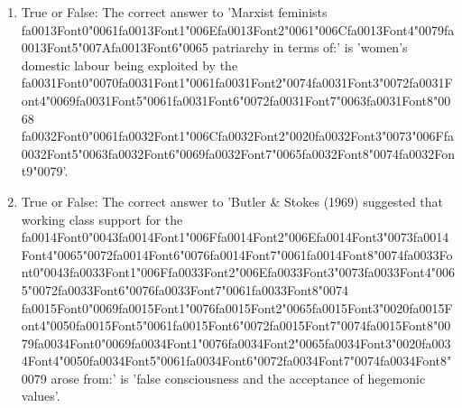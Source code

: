 \documentclass[12pt]{article}
\begin{document}
\begin{enumerate}[label=\arabic*.]
\item True or False: The correct answer to 'Marxist feminists {\csname fa0013Font0\endcsname\char"0061}{\csname fa0013Font1\endcsname\char"006E}{\csname fa0013Font2\endcsname\char"0061}{\char"006C}{\csname fa0013Font4\endcsname\char"0079}{\csname fa0013Font5\endcsname\char"007A}{\csname fa0013Font6\endcsname\char"0065} patriarchy in terms of:' is 'women's domestic labour being exploited by the {\csname fa0031Font0\endcsname\char"0070}{\csname fa0031Font1\endcsname\char"0061}{\csname fa0031Font2\endcsname\char"0074}{\csname fa0031Font3\endcsname\char"0072}{\csname fa0031Font4\endcsname\char"0069}{\csname fa0031Font5\endcsname\char"0061}{\csname fa0031Font6\endcsname\char"0072}{\csname fa0031Font7\endcsname\char"0063}{\csname fa0031Font8\endcsname\char"0068} {\csname fa0032Font0\endcsname\char"0061}{\csname fa0032Font1\endcsname\char"006C}{\csname fa0032Font2\endcsname\char"0020}{\csname fa0032Font3\endcsname\char"0073}{\char"006F}{\csname fa0032Font5\endcsname\char"0063}{\csname fa0032Font6\endcsname\char"0069}{\csname fa0032Font7\endcsname\char"0065}{\csname fa0032Font8\endcsname\char"0074}{\csname fa0032Font9\endcsname\char"0079}'.
\item True or False: The correct answer to 'Butler \& Stokes (1969) suggested that working class support for the {\csname fa0014Font0\endcsname\char"0043}{\csname fa0014Font1\endcsname\char"006F}{\csname fa0014Font2\endcsname\char"006E}{\csname fa0014Font3\endcsname\char"0073}{\csname fa0014Font4\endcsname\char"0065}{\char"0072}{\csname fa0014Font6\endcsname\char"0076}{\csname fa0014Font7\endcsname\char"0061}{\csname fa0014Font8\endcsname\char"0074}{\csname fa0033Font0\endcsname\char"0043}{\csname fa0033Font1\endcsname\char"006F}{\csname fa0033Font2\endcsname\char"006E}{\csname fa0033Font3\endcsname\char"0073}{\csname fa0033Font4\endcsname\char"0065}{\char"0072}{\csname fa0033Font6\endcsname\char"0076}{\csname fa0033Font7\endcsname\char"0061}{\csname fa0033Font8\endcsname\char"0074} {\csname fa0015Font0\endcsname\char"0069}{\csname fa0015Font1\endcsname\char"0076}{\csname fa0015Font2\endcsname\char"0065}{\csname fa0015Font3\endcsname\char"0020}{\csname fa0015Font4\endcsname\char"0050}{\csname fa0015Font5\endcsname\char"0061}{\csname fa0015Font6\endcsname\char"0072}{\csname fa0015Font7\endcsname\char"0074}{\csname fa0015Font8\endcsname\char"0079}{\csname fa0034Font0\endcsname\char"0069}{\csname fa0034Font1\endcsname\char"0076}{\csname fa0034Font2\endcsname\char"0065}{\csname fa0034Font3\endcsname\char"0020}{\csname fa0034Font4\endcsname\char"0050}{\csname fa0034Font5\endcsname\char"0061}{\csname fa0034Font6\endcsname\char"0072}{\csname fa0034Font7\endcsname\char"0074}{\csname fa0034Font8\endcsname\char"0079} arose from:' is 'false consciousness and the acceptance of hegemonic values'.

\end{enumerate}
\end{document}
